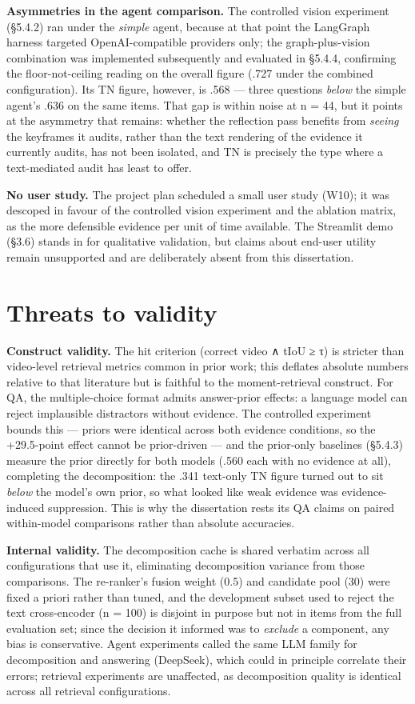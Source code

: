 \textbf{Asymmetries in the agent comparison.} The controlled vision
experiment (§5.4.2) ran under the \emph{simple} agent, because at that
point the LangGraph harness targeted OpenAI-compatible providers only;
the graph-plus-vision combination was implemented subsequently and
evaluated in §5.4.4, confirming the floor-not-ceiling reading on the
overall figure (.727 under the combined configuration). Its TN figure,
however, is .568 --- three questions \emph{below} the simple agent's
.636 on the same items. That gap is within noise at n = 44, but it
points at the asymmetry that remains: whether the reflection pass
benefits from \emph{seeing} the keyframes it audits, rather than the
text rendering of the evidence it currently audits, has not been
isolated, and TN is precisely the type where a text-mediated audit has
least to offer.

\textbf{No user study.} The project plan scheduled a small user study
(W10); it was descoped in favour of the controlled vision experiment and
the ablation matrix, as the more defensible evidence per unit of time
available. The Streamlit demo (§3.6) stands in for qualitative
validation, but claims about end-user utility remain unsupported and are
deliberately absent from this dissertation.

\section{Threats to validity}

\textbf{Construct validity.} The hit criterion (correct video ∧ tIoU ≥
τ) is stricter than video-level retrieval metrics common in prior work;
this deflates absolute numbers relative to that literature but is
faithful to the moment-retrieval construct. For QA, the multiple-choice
format admits answer-prior effects: a language model can reject
implausible distractors without evidence. The controlled experiment
bounds this --- priors were identical across both evidence conditions,
so the +29.5-point effect cannot be prior-driven --- and the prior-only
baselines (§5.4.3) measure the prior directly for both models (.560 each
with no evidence at all), completing the decomposition: the .341
text-only TN figure turned out to sit \emph{below} the model's own
prior, so what looked like weak evidence was evidence-induced
suppression. This is why the dissertation rests its QA claims on paired
within-model comparisons rather than absolute accuracies.

\textbf{Internal validity.} The decomposition cache is shared verbatim
across all configurations that use it, eliminating decomposition
variance from those comparisons. The re-ranker's fusion weight (0.5) and
candidate pool (30) were fixed a priori rather than tuned, and the
development subset used to reject the text cross-encoder (n = 100) is
disjoint in purpose but not in items from the full evaluation set; since
the decision it informed was to \emph{exclude} a component, any bias is
conservative. Agent experiments called the same LLM family for
decomposition and answering (DeepSeek), which could in principle
correlate their errors; retrieval experiments are unaffected, as
decomposition quality is identical across all retrieval configurations.

